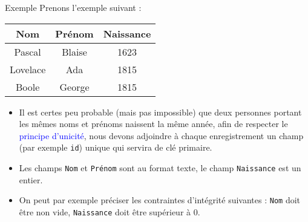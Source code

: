 \documentclass[10pt]{beamer}
\begin{document}
\begin{frame}
	\mframe{\DB}
	\begin{exampleblock}{Exemple}
		Prenons l'exemple suivant :
		\begin{center}
			{\footnotesize \begin{tabular}{|c|c|c|}
					\hline
					Nom      & Prénom & Naissance \\
					\hline
					Pascal   & Blaise & 1623      \\
					\hline
					Lovelace & Ada    & 1815      \\
					\hline
					Boole    & George & 1815      \\
					\hline
				\end{tabular}} \end{center}
		\begin{itemize}
			\item<1->	Il est certes peu probable (mais pas impossible) que deux personnes portant les mêmes noms et prénoms naissent la même année, afin de respecter le \textcolor{blue}{principe d'unicité}, nous devons adjoindre à chaque enregistrement un champ (par exemple {\tt id}) unique qui servira de clé primaire.
			\item<2-> Les champs {\tt Nom} et {\tt Prénom} sont au format texte, le champ {\tt Naissance} est un entier.
			\item<3-> On peut par exemple préciser les contraintes d'intégrité suivantes : {\tt Nom} doit être non vide, {\tt Naissance} doit être supérieur à 0.
		\end{itemize}
	\end{exampleblock}
\end{frame}
\end{document}
